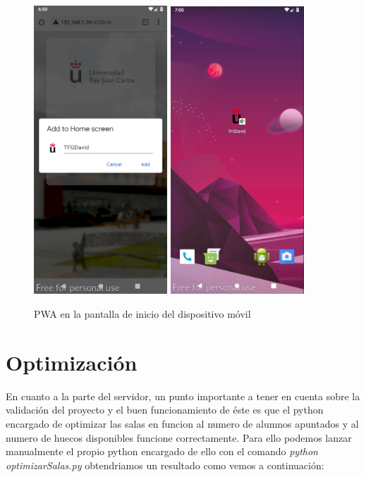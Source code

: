 \documentclass[a4paper, 12pt]{book}
\begin{document}
	\begin{figure}[H]
  	\centering
  	\includegraphics[width=5cm, keepaspectratio]{img/addHomeMovil.png}
  	\includegraphics[width=5cm, keepaspectratio]{img/homeMovil.png}
  	\caption{PWA en la pantalla de inicio del dispositivo móvil}\label{fig:homeMovil}
	\end{figure} 
 
\section{Optimización}
En cuanto a la parte del servidor, un punto importante a tener en cuenta sobre la validación del proyecto y el buen funcionamiento de éste es que el python encargado de optimizar las salas en funcion al numero de alumnos apuntados y al numero de huecos disponibles funcione correctamente. Para ello podemos lanzar manualmente el propio python encargado de ello con el comando \textit{python optimizarSalas.py} obtendriamos un resultado como vemos a continuación:
 
\end{document}
